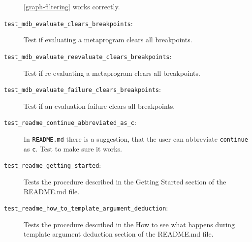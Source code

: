 \begin{description}
        \ref{graph-filtering} works correctly.
    \item[\texttt{test\_mdb\_evaluate\_clears\_breakpoints}:]
        Test if evaluating a metaprogram clears all breakpoints.
    \item[\texttt{test\_mdb\_evaluate\_reevaluate\_clears\_breakpoints}:]
        Test if re-evaluating a metaprogram clears all breakpoints.
    \item[\texttt{test\_mdb\_evaluate\_failure\_clears\_breakpoints}:]
        Test if an evaluation failure clears all breakpoints.
    \item[\texttt{test\_readme\_continue\_abbreviated\_as\_c}:]
        In \texttt{README.md} there is a suggestion, that the user can
        abbreviate \texttt{continue} as \texttt{c}. Test to make sure it works.
    \item[\texttt{test\_readme\_getting\_started}:]
        Tests the procedure described in the Getting Started section of the
        README.md file.
    \item[\texttt{test\_readme\_how\_to\_template\_argument\_deduction}:]
        Tests the procedure described in the How to see what happens during
        template argument deduction section of the README.md file.
\end{description}

